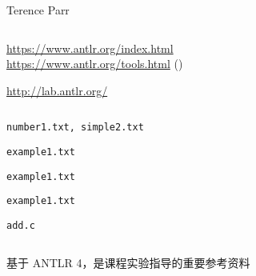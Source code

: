 \begin{frame}{}
  \begin{columns}
    \begin{center}
      Terence Parr
    \end{center}
  \end{columns}

  \vspace{0.80cm}
  \begin{center}
    \url{https://www.antlr.org/index.html} \\[5pt]
    \url{https://www.antlr.org/tools.html} ()
  \end{center}
\end{frame}

\begin{frame}{}
  \begin{center}
    \url{http://lab.antlr.org/}
  \end{center}

  \pause
  \vspace{0.80cm}

  \begin{columns}
    \begin{description}[<+->]
      \setlength{\itemsep}{10pt}
      \item[arithmetic:] \texttt{number1.txt, simple2.txt}
      \item[fol:] \texttt{example1.txt}
      \item[guitartab:] \texttt{example1.txt}
      \item[xyz:] \texttt{example1.txt}
      \item[C:] \texttt{add.c}
    \end{description}
  \end{columns}
\end{frame}

\begin{frame}{}
  \begin{columns}
  \end{columns}

  \vspace{0.50cm}
  \begin{center}
    基于 ANTLR 4，是课程实验指导的重要参考资料
  \end{center}
\end{frame}

